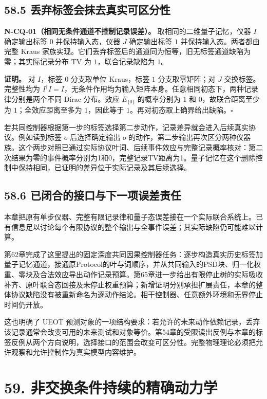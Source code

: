 \documentclass[
  11pt,
  oneside]{book}
\begin{document}
\section{58.5 丢弃标签会抹去真实可区分性}

\protect\hypertarget{n-cq-01}{}{}

\textbf{N-CQ-01（相同无条件通道不控制记录误差）。}
取相同的二维量子记忆，仪器 \(I\) 确定输出标签 \(0\) 并保持输入态，仪器
\(J\) 确定输出标签 \(1\) 并保持输入态。两者都由完整 Kraus
家族实现。它们丢弃标签后的通道同为恒等，旧无标签通道缺陷为零；其实际记录分布
TV 为 \(1\)，联合记录缺陷为 \(1\)。

\textbf{证明。} 对 \(I\)，标签 \(0\) 分支取单位 Kraus，标签 \(1\)
分支取零矩阵；对 \(J\) 交换标签。完整性均为
\(I^\dagger I=I\)，无条件作用均为输入矩阵本身。任意相同初态下，两种记录律分别是两个不同
Dirac 分布。效应 \(E_{\{0\}}\) 的概率分别为 \(1\) 和
\(0\)，故联合距离至少为 \(1\)；全效应距离至多为 \(1\)，因此等于
\(1\)。再对初态取上确界给出缺陷。\(\square\)

若共同控制器根据第一步的标签选择第二步动作，记录差异就会进入后续真实协议。例如读到标签
\(o\) 后选择确定输出 \(o\)
的动作，第二步输出再次区分两种仪器族。这个两步对照已通过实际协议叶词、后续事件效应与完整记录概率核对：第二次结果为零的事件概率分别为1和0，完整记录TV距离为1。量子记忆在这个删除控制中保持相同，已证明的差异位于实际记录及其后续选择。

\section{58.6 已闭合的接口与下一项误差责任}

本章把原有单步仪器、完整有限记录律和量子态误差接在一个实际联合系统上。已有信息足以讨论每个有限协议的整个输出与全事件误差；其实际缺陷仍可能难以计算。

第62章完成了这里提出的固定深度共同因果控制器任务：逐步构造真实历史标签加量子记忆通道，接通原Protocol的叶与词顺序，并从共同输入的PSD块、归一化权重、零块及合法效应导出动作记录预算。第65章进一步给出有限停止树的实际吸收补齐、原叶联合态回接及未停止权重预算；新增证明分别承担扩展责任，本章的整体协议缺陷没有被重新命名为逐动作结论。相干控制器、任意额外环境和无界停止时间仍开放。

这也明确了 UEOT
预测对象的一项结构要求：若允许的未来动作依赖记录，丢弃该记录通常会改变可用的未来测试和对象等价。第54章的受限读出反例与本章的标签反例从两个方向说明，选择接口的范围会改变可区分性。完整物理理论必须把允许观察和允许控制作为真实模型内容维护。

\chapter{59. 非交换条件持续的精确动力学}\label{ch-59}\hypertarget{ch-59}{}
\end{document}
